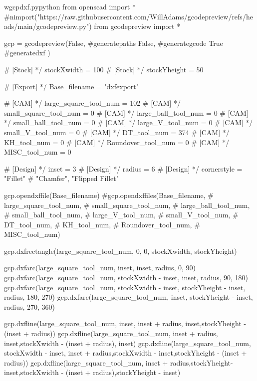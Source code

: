 \documentclass{ltxdoc}
\begin{document}

\lstset{firstnumber=1}%
\begin{writecode}{w}{gcpdxf.py}{python}
from openscad import *
#nimport("https://raw.githubusercontent.com/WillAdams/gcodepreview/refs/heads/main/gcodepreview.py")
from gcodepreview import *

gcp = gcodepreview(False, #generatepaths
                   False, #generategcode
                   True #generatedxf
                   )

# [Stock] */
stockXwidth = 100
# [Stock] */
stockYheight = 50

# [Export] */
Base_filename = "dxfexport"


# [CAM] */
large_square_tool_num = 102
# [CAM] */
small_square_tool_num = 0
# [CAM] */
large_ball_tool_num = 0
# [CAM] */
small_ball_tool_num = 0
# [CAM] */
large_V_tool_num = 0
# [CAM] */
small_V_tool_num = 0
# [CAM] */
DT_tool_num = 374
# [CAM] */
KH_tool_num = 0
# [CAM] */
Roundover_tool_num = 0
# [CAM] */
MISC_tool_num = 0

# [Design] */
inset = 3
# [Design] */
radius = 6
# [Design] */
cornerstyle = "Fillet" # "Chamfer", "Flipped Fillet"

gcp.opendxffile(Base_filename)
#gcp.opendxffiles(Base_filename,
#                 large_square_tool_num,
#                 small_square_tool_num,
#                 large_ball_tool_num,
#                 small_ball_tool_num,
#                 large_V_tool_num,
#                 small_V_tool_num,
#                 DT_tool_num,
#                 KH_tool_num,
#                 Roundover_tool_num,
#                 MISC_tool_num)

gcp.dxfrectangle(large_square_tool_num, 0, 0, stockXwidth, stockYheight)

gcp.dxfarc(large_square_tool_num, inset,  inset, radius,   0,  90)
gcp.dxfarc(large_square_tool_num, stockXwidth - inset,  inset, radius,  90, 180)
gcp.dxfarc(large_square_tool_num, stockXwidth - inset, stockYheight - inset, radius, 180, 270)
gcp.dxfarc(large_square_tool_num, inset, stockYheight - inset, radius, 270, 360)

gcp.dxfline(large_square_tool_num, inset, inset + radius, inset,stockYheight - (inset + radius))
gcp.dxfline(large_square_tool_num, inset + radius, inset,stockXwidth - (inset + radius), inset)
gcp.dxfline(large_square_tool_num, stockXwidth - inset, inset + radius,stockXwidth - inset,stockYheight - (inset + radius))
gcp.dxfline(large_square_tool_num, inset + radius,stockYheight-inset,stockXwidth - (inset + radius),stockYheight - inset)
    

\end{writecode}
\end{document}
